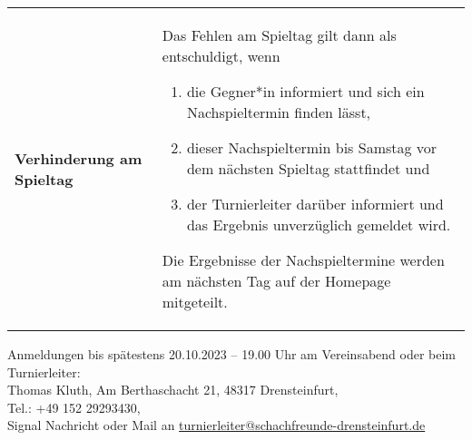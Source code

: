 \documentclass[a4paper,parskip=full-,DIV18]{scrartcl}
\begin{document}
\begin{tabular}{p{3 cm} p{13.5 cm}}
    \textbf{Verhinderung am Spieltag} & Das Fehlen am Spieltag gilt dann als entschuldigt, wenn 
    \begin{enumerate}
        \item die Gegner*in informiert und sich ein Nachspieltermin finden lässt,
        \item dieser Nachspieltermin bis Samstag vor dem nächsten Spieltag stattfindet und
        \item der Turnierleiter darüber informiert und das Ergebnis unverzüglich gemeldet wird.       
    \end{enumerate}
    Die Ergebnisse der Nachspieltermine werden am nächsten Tag auf der Homepage mitgeteilt.   
\end{tabular}

\bigskip
Anmeldungen bis spätestens 20.10.2023 – 19.00 Uhr am Vereinsabend oder beim Turnierleiter:\\
Thomas Kluth, Am Berthaschacht 21, 48317 Drensteinfurt, \\Tel.: +49 152 29293430,\\ Signal Nachricht oder  Mail an 
\href{mailto:turnierleiter@schachfreunde-drensteinfurt.de}{turnierleiter@schachfreunde-drensteinfurt.de}
\end{document}
